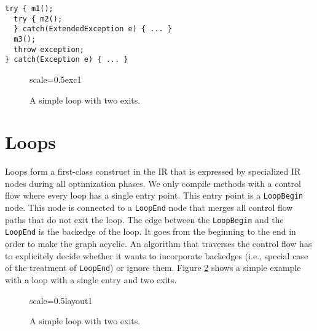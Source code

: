 \documentclass[twocolumn]{svjour3}
\newcommand\nodename[1]{\texttt{#1}}
\begin{document}
\begin{lstlisting}[label=lst:exc1, caption=Exception dispatch in the compiler graph, captionpos=b]
try { m1();
  try { m2();
  } catch(ExtendedException e) { ... }
  m3();
  throw exception;
} catch(Exception e) { ... }
\end{lstlisting}



\begin{figure}[h]
  \centering
\begin{digraphenv}{scale=0.5}{exc1}
\end{digraphenv}
  \caption{A simple loop with two exits.}
  \label{fig:exc1}
\end{figure}

\section{Loops}
\label{sec:loops}
Loops form a first-class construct in the IR that is expressed by specialized IR nodes during all optimization phases.
We only compile methods with a control flow where every loop has a single entry point.
This entry point is a \nodename{LoopBegin} node.
This node is connected to a \nodename{LoopEnd} node that merges all control flow paths that do not exit the loop.
The edge between the \nodename{LoopBegin} and the \nodename{LoopEnd} is the backedge of the loop.
It goes from the beginning to the end in order to make the graph acyclic.
An algorithm that traverses the control flow has to explicitely decide whether it wants to incorporate backedges (i.e., special case of the treatment of \nodename{LoopEnd}) or ignore them.
Figure \ref{fig:loop1} shows a simple example with a loop with a single entry and two exits.

\begin{figure}[h]
  \centering
\begin{digraphenv}{scale=0.5}{layout1}
\end{digraphenv}
  \caption{A simple loop with two exits.}
  \label{fig:loop1}
\end{figure}
\end{document}
